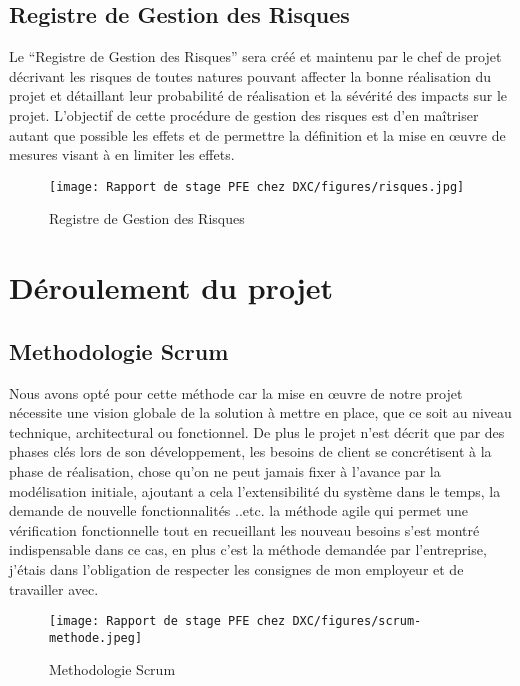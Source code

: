 \subsection{Registre de Gestion des Risques} 

Le “Registre de Gestion des Risques” sera créé et maintenu par le chef de projet
décrivant les risques de toutes natures pouvant affecter la bonne réalisation du projet et
détaillant leur probabilité de réalisation et la sévérité des impacts sur le projet. L’objectif de cette procédure de gestion des risques est d’en maîtriser autant que possible les effets et de permettre la définition et la mise en œuvre de mesures visant à en limiter les effets.

\begin{figure}[!h]
    \centering
    \texttt{[image: Rapport de stage PFE chez DXC/figures/risques.jpg]}
    \caption{Registre de Gestion des Risques}
\end{figure}

\section{Déroulement du projet}

\subsection{Methodologie Scrum}

Nous avons opté pour cette méthode car la mise en œuvre de notre projet nécessite une vision globale de la solution à mettre en place, que ce soit au niveau technique, architectural ou fonctionnel. De plus le projet n’est décrit que par des phases clés lors de son développement, les besoins de client se concrétisent à la phase de réalisation, chose qu’on ne peut jamais fixer à l’avance par la modélisation initiale, ajoutant a cela l’extensibilité du système dans le temps, la demande de nouvelle fonctionnalités ..etc. la méthode agile qui permet une vérification fonctionnelle tout en recueillant les nouveau besoins s’est montré indispensable dans ce cas, en plus c’est la méthode demandée par l’entreprise, j’étais dans l’obligation de respecter les consignes de mon employeur et de travailler avec.

\begin{figure}[!h]
    \centering
    \texttt{[image: Rapport de stage PFE chez DXC/figures/scrum-methode.jpeg]}
    \caption{Methodologie Scrum}
\end{figure}

